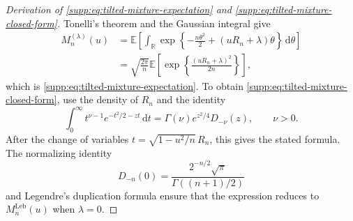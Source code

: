 \documentclass[numsec,webpdf,modern,medium,namedate]{oup-authoring-template}
\theoremstyle{thmstyleone}
\theoremstyle{thmstyletwo}
\newcommand{\R}{\mathbb{R}}
\newcommand{\E}{\mathbb{E}}
\newcommand{\dd}{\mathrm{d}}
\newcommand{\Leb}{\mathrm{Leb}}
\begin{document}
\begin{proof}[Derivation of
\eqref{supp:eq:tilted-mixture-expectation} and
\eqref{supp:eq:tilted-mixture-closed-form}]
Tonelli's theorem and the Gaussian integral give
\begin{align}
  M_n^{(\lambda)}(u)
  &={}
  \E\left[
    \int_{\R}
    \exp\left\{
      -\frac{n\theta^2}{2}
      +(uR_n+\lambda)\theta
    \right\}\,\dd\theta
  \right]
  \nonumber\\
  &={}
  \sqrt{\frac{2\pi}{n}}
  \E\left[
    \exp\left\{
      \frac{(uR_n+\lambda)^2}{2n}
    \right\}
  \right],
\label{supp:eq:gaussian-integral-derivation}
\end{align}
which is \eqref{supp:eq:tilted-mixture-expectation}.  To obtain
\eqref{supp:eq:tilted-mixture-closed-form}, use the density of $R_n$
and the identity
\begin{equation}
\label{supp:eq:parabolic-cylinder-identity}
  \int_0^\infty
  t^{\nu-1}e^{-t^2/2-zt}\,\dd t
  =
  \Gamma(\nu)e^{z^2/4}D_{-\nu}(z),
  \qquad \nu>0.
\end{equation}
After the change of variables
$t=\sqrt{1-u^2/n}\,R_n$, this gives the stated formula.  The
normalizing identity
\begin{equation}
\label{supp:eq:parabolic-cylinder-zero}
  D_{-n}(0)
  =
  \frac{2^{-n/2}\sqrt\pi}{\Gamma((n+1)/2)}
\end{equation}
and Legendre's duplication formula ensure that the expression reduces
to $M_n^{\Leb}(u)$ when $\lambda=0$.
\end{proof}



\end{document}
